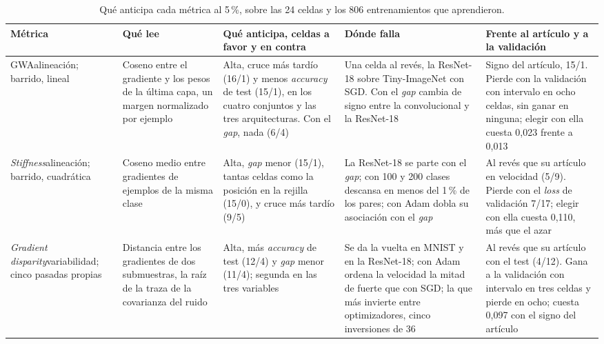 \begin{table}[htbp]
\centering
\scriptsize
\setlength{\tabcolsep}{3pt}
\caption{Qué anticipa cada métrica al 5\,\%, sobre las 24 celdas y los 806 entrenamientos que aprendieron.}
\label{tab:aportaciones}
\begin{tabular}{>{\raggedright\arraybackslash}p{1.9cm}
                >{\raggedright\arraybackslash}p{2.5cm}
                >{\raggedright\arraybackslash}p{3.5cm}
                >{\raggedright\arraybackslash}p{3.0cm}
                >{\raggedright\arraybackslash}p{2.9cm}}
\toprule
\textbf{Métrica} & \textbf{Qué lee} & \textbf{Qué anticipa, celdas a favor y en contra} & \textbf{Dónde falla} & \textbf{Frente al artículo y a la validación} \\
\midrule
GWA\newline alineación; barrido, lineal & Coseno entre el gradiente y los pesos de la última capa, un margen normalizado por ejemplo & Alta, cruce más tardío (16/1) y menos \emph{accuracy} de test (15/1), en los cuatro conjuntos y las tres arquitecturas. Con el \emph{gap}, nada (6/4) & Una celda al revés, la ResNet-18 sobre Tiny-ImageNet con SGD. Con el \emph{gap} cambia de signo entre la convolucional y la ResNet-18 & Signo del artículo, 15/1. Pierde con la validación con intervalo en ocho celdas, sin ganar en ninguna; elegir con ella cuesta 0,023 frente a 0,013 \\
\addlinespace[2pt]
\emph{Stiffness}\newline alineación; barrido, cuadrática & Coseno medio entre gradientes de ejemplos de la misma clase & Alta, \emph{gap} menor (15/1), tantas celdas como la posición en la rejilla (15/0), y cruce más tardío (9/5) & La ResNet-18 se parte con el \emph{gap}; con 100 y 200 clases descansa en menos del 1\,\% de los pares; con Adam dobla su asociación con el \emph{gap} & Al revés que su artículo en velocidad (5/9). Pierde con el \emph{loss} de validación 7/17; elegir con ella cuesta 0,110, más que el azar \\
\addlinespace[2pt]
\emph{Gradient disparity}\newline variabilidad; cinco pasadas propias & Distancia entre los gradientes de dos submuestras, la raíz de la traza de la covarianza del ruido & Alta, más \emph{accuracy} de test (12/4) y \emph{gap} menor (11/4); segunda en las tres variables & Se da la vuelta en MNIST y en la ResNet-18; con Adam ordena la velocidad la mitad de fuerte que con SGD; la que más invierte entre optimizadores, cinco inversiones de 36 & Al revés que su artículo con el test (4/12). Gana a la validación con intervalo en tres celdas y pierde en ocho; cuesta 0,097 con el signo del artículo \\

\end{tabular}
\end{table}
